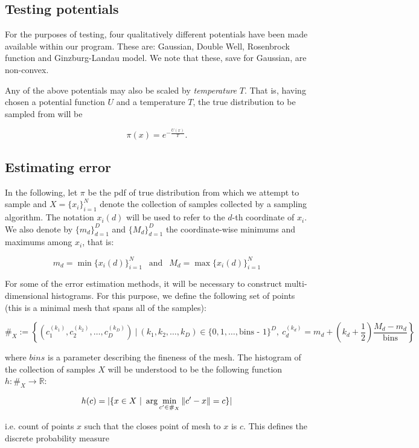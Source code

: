 \subsection{Testing potentials}
For the purposes of testing, four qualitatively different potentials have been made available within our program. These are: Gaussian, Double Well, Rosenbrock function and Ginzburg-Landau model. We note that these, save for Gaussian, are non-convex.

Any of the above potentials may also be scaled by \textit{temperature} $T$. That is, having chosen a potential function $U$ and a temperature $T$, the true distribution to be sampled from will be

\[\pi(x) = e^{-\frac{U(x)}{T}}.\]

\subsection{Estimating error}

In the following, let $\pi$ be the pdf of true distribution from which we attempt to sample and $X = \{x_i\}_{i=1}^N$ denote the collection of samples collected by a sampling algorithm. The notation $x_i(d)$ will be used to refer to the $d$-th coordinate of $x_i$. We also denote by $\{m_d\}_{d=1}^D$ and $\{M_d\}_{d=1}^D$ the coordinate-wise minimums and maximums among $x_i$, that is:

$$ 
    m_d = \min \{x_i(d)\}_{i=1}^N \ \ \text{ and } \ \ M_d = \max \{x_i(d)\}_{i=1}^N
$$

For some of the error estimation methods, it will be necessary to construct multi-dimensional histograms. For this purpose, we define the following set of points (this is a minimal mesh that spans all of the samples):

$$
\#_X := \left\{ \left(c_1^{(k_1)}, c_2^{(k_2)}, \dots, c_D^{(k_D)}\right)\ |\ (k_1, k_2, \dots, k_D) \in \{0, 1, \dots, \text{bins - 1}\}^D, \ c_d^{(k_d)} = m_d + \left(k_d + \frac 1 2\right) \frac{M_d - m_d}{\text{bins}} \right\}
$$

where $bins$ is a parameter describing the fineness of the mesh. The histogram of the collection of samples $X$ will be understood to be the following function $h: \#_X \rightarrow \mathbb R$:

$$
    h(c) = |\{x \in X\ |\ \arg \min_{c' \in \#_X} \norm{c' - x} = c \}|
$$

i.e. count of points $x$ such that the closes point of mesh to $x$ is $c$. This defines the discrete probability measure 

